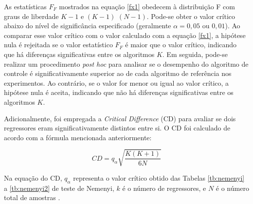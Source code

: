  
As estatísticas $F_F$ mostrados na equação \eqref{fx1} obedecem à distribuição F com graus de liberdade $K-1$ e $(K-1)$ $(N-1)$. Pode-se obter o valor crítico abaixo do nível de significância especificado (geralmente $\alpha = 0,05$ ou $0,01$). Ao comparar esse valor crítico com o valor calculado com a equação \eqref{fx1}, a hipótese nula é rejeitada se o valor estatístico $F_F$ é maior que o valor crítico, indicando que há diferenças significativas entre os algoritmos $K$. Em seguida, pode-se realizar um procedimento \textit{post hoc} para analisar se o desempenho do algoritmo de controle é significativamente superior ao de cada algoritmo de referência nos experimentos. Ao contrário, se o valor for menor ou igual ao valor crítico, a hipótese nula é aceita, indicando que não há diferenças significativas entre os algoritmos $K$.
  
Adicionalmente, foi empregada a \textit{Critical Difference} (CD) para avaliar se dois regressores eram significativamente distintos entre si. O CD foi calculado de acordo com a fórmula mencionada anteriormente:

\begin{equation}
	CD = q_\alpha \sqrt{\frac{K(K+1)}{6N}}
\end{equation}

\noindent Na equação do CD, $q_\alpha$ representa o valor crítico obtido das Tabelas \ref{tb:nemenyi} a \ref{tb:nemenyi2} de teste de Nemenyi, $k$ é o número de regressores, e $N$ é o número total de amostras \cite{Liu2022}.
 
 
 
